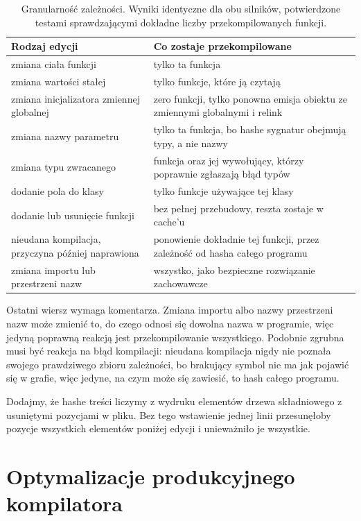 \documentclass[11pt,a4paper]{article}
\begin{document}
\begin{table}[htbp]
\centering
\caption{Granularność zależności. Wyniki identyczne dla obu silników,
potwierdzone testami sprawdzającymi dokładne liczby przekompilowanych funkcji.}
\label{tab:granularnosc}
\small
\begin{tabular}{@{}p{6.4cm}p{7.8cm}@{}}
\toprule
\textbf{Rodzaj edycji} & \textbf{Co zostaje przekompilowane} \\
\midrule
zmiana ciała funkcji & tylko ta funkcja \\
zmiana wartości stałej & tylko funkcje, które ją czytają \\
zmiana inicjalizatora zmiennej globalnej & zero funkcji, tylko ponowna emisja obiektu ze zmiennymi globalnymi i relink \\
zmiana nazwy parametru & tylko ta funkcja, bo hashe sygnatur obejmują typy, a nie nazwy \\
zmiana typu zwracanego & funkcja oraz jej wywołujący, którzy poprawnie zgłaszają błąd typów \\
dodanie pola do klasy & tylko funkcje używające tej klasy \\
dodanie lub usunięcie funkcji & bez pełnej przebudowy, reszta zostaje w cache'u \\
nieudana kompilacja, przyczyna później naprawiona & ponowienie dokładnie tej funkcji, przez zależność od hasha całego programu \\
zmiana importu lub przestrzeni nazw & wszystko, jako bezpieczne rozwiązanie zachowawcze \\
\bottomrule
\end{tabular}
\end{table}

Ostatni wiersz wymaga komentarza. Zmiana importu albo nazwy przestrzeni nazw może
zmienić to, do czego odnosi się dowolna nazwa w programie, więc jedyną poprawną
reakcją jest przekompilowanie wszystkiego. Podobnie zgrubna musi być reakcja na
błąd kompilacji: nieudana kompilacja nigdy nie poznała swojego prawdziwego
zbioru zależności, bo brakujący symbol nie ma jak pojawić się w grafie, więc
jedyne, na czym może się zawiesić, to hash całego programu.

Dodajmy, że hashe treści liczymy z wydruku elementów drzewa składniowego %
z usuniętymi pozycjami w pliku. Bez tego wstawienie jednej linii przesunęłoby
pozycje wszystkich elementów poniżej edycji i unieważniło je wszystkie.

\section{Optymalizacje produkcyjnego kompilatora}
\label{sec:optymalizacje}
\end{document}
